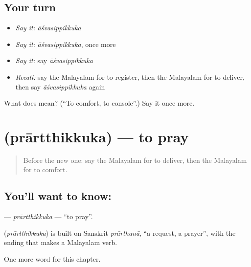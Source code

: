 \subsection*{Your turn}
\begin{itemize}
\raggedright
  \item \emph{Say it:} \emph{āśvasippikkuka}
  \item \emph{Say it:} \emph{āśvasippikkuka}, once more
  \item \emph{Say it:} say \emph{āśvasippikkuka}
  \item \emph{Recall:} say the Malayalam for to register, then the Malayalam for to deliver, then say \emph{āśvasippikkuka} again
\end{itemize}

\begin{tcolorbox}[breakable,colback=teal!4,colframe=teal!35!black,title={Before you move on}]
What does  mean? (\textquotedblleft{}To comfort, to console\textquotedblright{}.) Say it once more.
\end{tcolorbox}
\section[\texorpdfstring{\ml{പ്രാർത്ഥിക്കുക} (prārtthikkuka)}{പ്രാർത്ഥിക്കുക (prārtthikkuka)}]{ (prārtthikkuka) — to pray}

\label{lesson:ML-C269-prartthikkuka}



\begin{quote}
Before the new one: say the Malayalam for to deliver, then the Malayalam for to comfort.
\end{quote}

\subsection*{You'll want to know: }
\textbf{} — \emph{prārtthikkuka} — \textquotedblleft{}to pray\textquotedblright{}.

\begin{cousinweb}
\textbf{} (\emph{prārtthikkuka}) is built on Sanskrit \emph{prārthanā}, \textquotedblleft{}a request, a prayer\textquotedblright{}, with the ending that makes a Malayalam verb.
\end{cousinweb}

\begin{grammarlens}[title={What you've built}]
One more word for this chapter.
\end{grammarlens}

